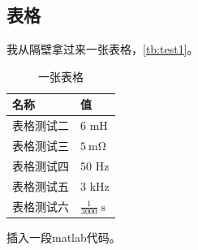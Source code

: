 \documentclass{myreport}
\begin{document}
\subsection{表格}
我从隔壁拿过来一张表格，\autoref{tb:test1}。

\begin{table}[!h]
\caption{一张表格}
\label{tb:test1}
\centering
\begin{tabular}{ll}
\hline
名称              & 值              \\ \hline
表格测试二        & 6 mH               \\
表格测试三         & $\mathrm{5\: m\Omega}$ \\
表格测试四 & 50 Hz               \\ 
表格测试五 & 3 kHz \\ 
表格测试六      & $\mathrm{\frac{1}{3000}\;s}$     \\ \hline
\end{tabular}
\end{table}

插入一段matlab代码。

%
\end{document}
